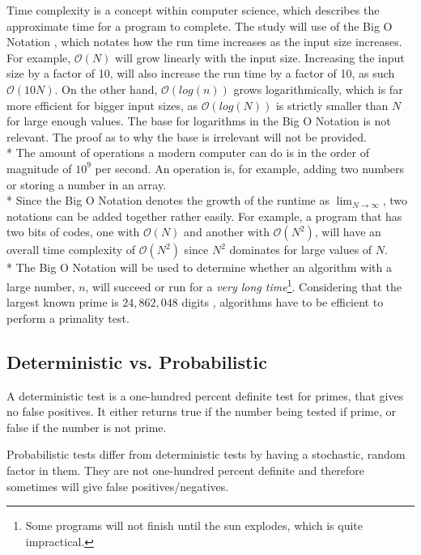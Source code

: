 \documentclass[main.tex]{subfiles}
\begin{document}
Time complexity \cite{theorem:time_comp} is a concept within computer science,
which describes the approximate time for a program to complete. The study will
use of the Big O Notation \cite{theorem:big_O}, which notates how the run time
increases as the input size increases. For example, $\mathcal{O}(N)$ will grow
linearly with the input size. Increasing the input size by a factor of 10, will
also increase the run time by a factor of 10, as such $\mathcal{O}(10N)$. On the
other hand, $\mathcal{O}(log(n))$ grows logarithmically, which is far more
efficient for bigger input sizes, as $\mathcal{O}(log(N))$ is strictly smaller
than $N$ for large enough values. The base for logarithms in the Big O Notation
is not relevant. The proof as to why the base is irrelevant will not be
provided. \newline
\\*
The amount of operations a modern computer can do is in the order of magnitude
of $10^{9}$ per second. An operation is, for example, adding two numbers or
storing a number in an array. \newline
\\*
Since the Big O Notation denotes the growth of the runtime as
$\lim_{N\to\infty}$, two notations can be added together rather easily. For
example, a program that has two bits of codes, one with $\mathcal{O}(N)$ and
another with $\mathcal{O}(N^{2})$, will have an overall time complexity of
$\mathcal{O}(N^{2})$ since $N^{2}$ dominates for large values of $N$. \newline
\\*
The Big O Notation will be used to determine whether an algorithm with a large
number, $n$, will succeed or run for a \textit{very long time}\footnote{Some
  programs will not finish until the sun explodes, which is quite impractical.}.
Considering that the largest known prime is $24,862,048$ digits
\cite{prime:largest_digits}, algorithms have to be efficient to perform a
primality test.

\subsection{Deterministic vs. Probabilistic}
A deterministic test is a one-hundred percent definite test for primes, that
gives no false positives. It either returns true if the number being tested if
prime, or false if the number is not prime. \newline

Probabilistic tests differ from deterministic tests by having a stochastic,
random factor in them. They are not one-hundred percent definite and therefore
sometimes will give false positives/negatives. \\
\end{document}
